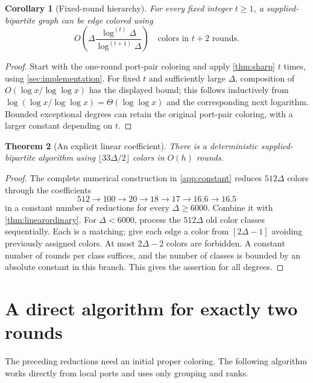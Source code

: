 \documentclass[11pt]{article}
\newtheorem{theorem}{Theorem}[section]
\newtheorem{corollary}[theorem]{Corollary}
\theoremstyle{definition}
\theoremstyle{remark}
\begin{document}
\begin{corollary}[Fixed-round hierarchy]\label{cor:hierarchy}
For every fixed integer $t\ge1$, a supplied-bipartite graph can be edge
colored using
\[
 O\!\left(\Delta\frac{\log^{(t)}\Delta}{\log^{(t+1)}\Delta}\right)
 \quad\text{colors in }t+2\text{ rounds}.
\]
\end{corollary}
\begin{proof}
Start with the one-round port-pair coloring and apply \cref{thm:sharp}
$t$ times, using \cref{sec:implementation}. For fixed $t$ and sufficiently
large $\Delta$, composition of $O(\log x/\log\log x)$ has the displayed
bound; this follows inductively from
$\log(\log x/\log\log x)=\Theta(\log\log x)$ and the corresponding
next logarithm. Bounded exceptional degrees can retain the original
port-pair coloring, with a larger constant depending on $t$.
\end{proof}

\begin{theorem}[An explicit linear coefficient]\label{thm:smallconstant}
There is a deterministic supplied-bipartite algorithm using
$\lfloor33\Delta/2\rfloor$ colors in $O(h)$ rounds.
\end{theorem}
\begin{proof}
The complete numerical construction in \cref{app:constant} reduces
$512\Delta$ colors through the coefficients
\[
 512\longrightarrow100\longrightarrow20\longrightarrow18
 \longrightarrow17\longrightarrow16.6\longrightarrow16.5
\]
in a constant number of reductions for every $\Delta\ge6000$.
Combine it with \cref{thm:linearordinary}. For $\Delta<6000$, process
the $512\Delta$ old color classes sequentially. Each is a matching;
give each edge a color from $[2\Delta-1]$ avoiding previously assigned
colors. At most $2\Delta-2$ colors are forbidden. A constant number of
rounds per class suffices, and the number of classes is bounded by an
absolute constant in this branch. This gives the assertion for all degrees.
\end{proof}

\section{A direct algorithm for exactly two rounds}\label{sec:tworounds}

The preceding reductions need an initial proper coloring. The following
algorithm works directly from local ports and uses only grouping and ranks.
\end{document}
